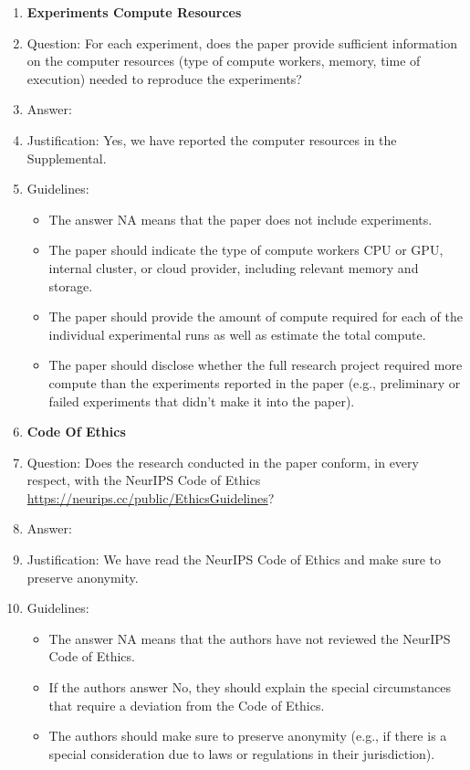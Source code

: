 \documentclass{article} %
\newcounter{ct}
\theoremstyle{definition}
\theoremstyle{remark}
\begin{document}
\begin{enumerate}
\item {\bf Experiments Compute Resources}
    \item[] Question: For each experiment, does the paper provide sufficient information on the computer resources (type of compute workers, memory, time of execution) needed to reproduce the experiments?
    \item[] Answer: \answerYes{} %
    \item[] Justification: Yes, we have reported the computer resources in the Supplemental.
    \item[] Guidelines:
    \begin{itemize}
        \item The answer NA means that the paper does not include experiments.
        \item The paper should indicate the type of compute workers CPU or GPU, internal cluster, or cloud provider, including relevant memory and storage.
        \item The paper should provide the amount of compute required for each of the individual experimental runs as well as estimate the total compute.
        \item The paper should disclose whether the full research project required more compute than the experiments reported in the paper (e.g., preliminary or failed experiments that didn't make it into the paper).
    \end{itemize}

\item {\bf Code Of Ethics}
    \item[] Question: Does the research conducted in the paper conform, in every respect, with the NeurIPS Code of Ethics \url{https://neurips.cc/public/EthicsGuidelines}?
    \item[] Answer: \answerYes{} %
    \item[] Justification: We have read the NeurIPS Code of Ethics and make sure to preserve anonymity.
    \item[] Guidelines:
    \begin{itemize}
        \item The answer NA means that the authors have not reviewed the NeurIPS Code of Ethics.
        \item If the authors answer No, they should explain the special circumstances that require a deviation from the Code of Ethics.
        \item The authors should make sure to preserve anonymity (e.g., if there is a special consideration due to laws or regulations in their jurisdiction).
    \end{itemize}



\end{enumerate}
\end{document}
